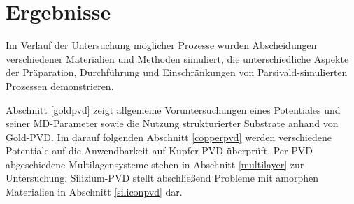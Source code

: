 \cleardoublepage
\chapter{Ergebnisse}


Im Verlauf der Untersuchung möglicher Prozesse wurden Abscheidungen verschiedener Materialien und Methoden simuliert, die unterschiedliche Aspekte der Präparation, Durchführung und Einschränkungen von Parsivald-simulierten Prozessen demonstrieren.

Abschnitt \ref{goldpvd} zeigt allgemeine Voruntersuchungen eines Potentiales und seiner MD-Parameter sowie die Nutzung strukturierter Substrate anhand von Gold-PVD.
Im darauf folgenden Abschnitt \ref{copperpvd} werden verschiedene Potentiale auf die Anwendbarkeit auf Kupfer-PVD überprüft.
Per PVD abgeschiedene Multilagensysteme stehen in Abschnitt \ref{multilayer} zur Untersuchung.
Silizium-PVD stellt abschließend Probleme mit amorphen Materialien in Abschnitt \ref{siliconpvd} dar.


\clearpage

\clearpage

\clearpage

\clearpage

